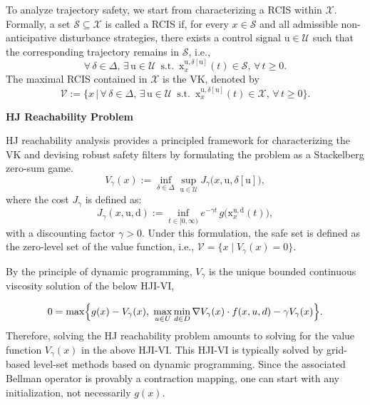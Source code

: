 \documentclass[12pt]{article}
\begin{document}
To analyze trajectory safety, we start from characterizing a RCIS within $\mathcal{X}$.
Formally, a set $\mathcal{S}\subseteq\mathcal{X}$ is called a RCIS if, for every $x\in\mathcal{S}$ and all admissible non-anticipative disturbance strategies, there exists a control signal $\mathrm{u}\in\mathcal{U}$ such that the corresponding trajectory remains in $\mathcal{S}$, i.e.,
\begin{equation}
    \forall\,\delta\in\Delta,\,\exists\,\mathrm{u}\in\mathcal{U}\,\text{ s.t. }\,    \mathrm{x}^{\mathrm{u},\delta[\mathrm{u}]}_{x}(t)\in \mathcal{S},\,
    \forall\,t\ge 0.    
    \label{eq:def_RCIS}
\end{equation}
The maximal RCIS contained in $\mathcal{X}$ is the VK, denoted by
\begin{equation}
    \mathcal{V} := \bigl\{
        x
        \,\big|\,
        \forall\,\delta\in\Delta,\,\exists\,\mathrm{u}\in\mathcal{U}\,\text{ s.t. }\,
        \mathrm{x}^{\mathrm{u},\delta[\mathrm{u}]}_{x}(t)\in\mathcal{X},\,
        \forall\,t\ge 0
    \bigr\}.
    \label{eq:def_viability kernel}
\end{equation}


\noindent\textbf{HJ Reachability Problem}

HJ reachability analysis provides a principled framework for characterizing the VK and devising robust safety filters by formulating the problem as a Stackelberg zero-sum game.
\begin{equation}
    V_{\gamma}(x):=\inf_{\delta\in\Delta}\sup_{\mathrm{u}\in\mathcal{U}}
    J_{\gamma}\bigl(x,\mathrm{u},\delta[\mathrm{u}]\bigr),
    \label{eq:value}
\end{equation}
where the cost $J_{\gamma}$ is defined as:
\begin{equation}
    J_{\gamma}(x,\mathrm{u},\mathrm{d})
    := \inf_{t\in[0,\infty)} e^{-\gamma t}\,
        g\bigl(\mathrm{x}^{\mathrm{u},\mathrm{d}}_{x}(t)\bigr),
    \label{eq:J_cost}
\end{equation}
with a discounting factor $\gamma > 0$. Under this formulation, the safe set is defined as the zero-level set of the value function, i.e., $\mathcal{V} = \{x \mid V_{\gamma}(x)=0 \}$.

By the principle of dynamic programming, $V_{\gamma}$ is the unique bounded continuous viscosity solution of the below HJI-VI,

\begin{equation}
    0=
    \max\Bigl\{
        g(x)-V_{\gamma}(x),\;
        \max_{u\in U}\min_{d\in D}
        \nabla  V_{\gamma}(x)\cdot f(x,u,d)-\gamma V_{\gamma}(x)
    \Bigr\}.
    \label{eq:HJI_VI}
\end{equation}
Therefore, solving the HJ reachability problem amounts to solving for the value function $V_{\gamma}(x)$ in the above HJI-VI. This HJI-VI is typically solved by grid-based level-set methods based on dynamic programming. Since the associated Bellman operator is provably a contraction mapping, one can start with any initialization, not necessarily $g(x)$.
\end{document}
